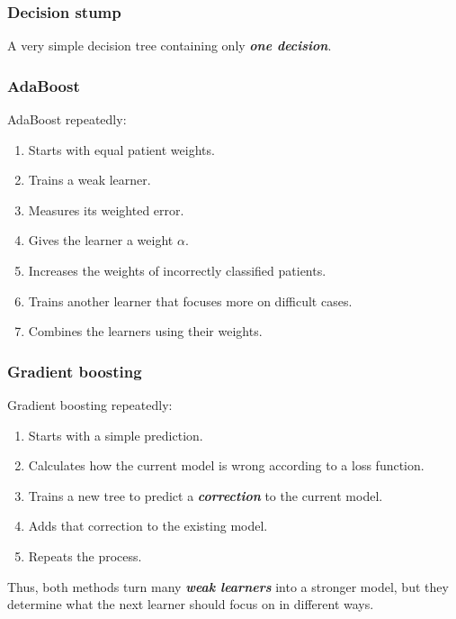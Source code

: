 \documentclass[10pt]{article}
\begin{document}
\subsubsection*{Decision stump}
A very simple decision tree containing only \textbf{\textit{one decision}}.

\subsubsection*{AdaBoost}
AdaBoost repeatedly:

\begin{enumerate}
\item
Starts with equal patient weights.

\item
Trains a weak learner.

\item
Measures its weighted error.

\item
Gives the learner a weight $\alpha$.

\item
Increases the weights of incorrectly classified patients.

\item
Trains another learner that focuses more on difficult cases.

\item
Combines the learners using their weights.

\end{enumerate}
\subsubsection*{Gradient boosting}
Gradient boosting repeatedly:

\begin{enumerate}
\item
Starts with a simple prediction.

\item
Calculates how the current model is wrong according to a loss function.

\item
Trains a new tree to predict a \textbf{\textit{correction}} to the current model.

\item
Adds that correction to the existing model.

\item
Repeats the process.

\end{enumerate}
Thus, both methods turn many \textbf{\textit{weak learners}} into a stronger model, but they determine what the next learner should focus on in different ways.
\end{document}
